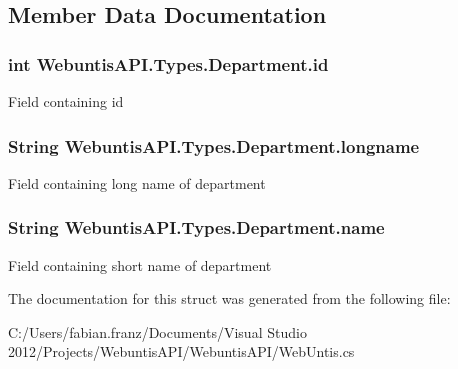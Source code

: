 \subsection{Member Data Documentation}
\hypertarget{struct_webuntis_a_p_i_1_1_types_1_1_department_a543d6d34378c9649d7cf72ea88bfbb61}{
\subsubsection[{id}]{\setlength{\rightskip}{0pt plus 5cm}int Webuntis\-A\-P\-I.\-Types.\-Department.\-id}}\label{struct_webuntis_a_p_i_1_1_types_1_1_department_a543d6d34378c9649d7cf72ea88bfbb61}
Field containing id \hypertarget{struct_webuntis_a_p_i_1_1_types_1_1_department_ac9d9a76d977fbdccfd18a7f88c88fbac}{
\subsubsection[{longname}]{\setlength{\rightskip}{0pt plus 5cm}String Webuntis\-A\-P\-I.\-Types.\-Department.\-longname}}\label{struct_webuntis_a_p_i_1_1_types_1_1_department_ac9d9a76d977fbdccfd18a7f88c88fbac}
Field containing long name of department \hypertarget{struct_webuntis_a_p_i_1_1_types_1_1_department_aa2a3990003b54bc6a9946be1c2ab5572}{
\subsubsection[{name}]{\setlength{\rightskip}{0pt plus 5cm}String Webuntis\-A\-P\-I.\-Types.\-Department.\-name}}\label{struct_webuntis_a_p_i_1_1_types_1_1_department_aa2a3990003b54bc6a9946be1c2ab5572}
Field containing short name of department 

The documentation for this struct was generated from the following file\-:\begin{DoxyCompactItemize}
\item 
C\-:/\-Users/fabian.\-franz/\-Documents/\-Visual Studio 2012/\-Projects/\-Webuntis\-A\-P\-I/\-Webuntis\-A\-P\-I/Web\-Untis.\-cs\end{DoxyCompactItemize}
